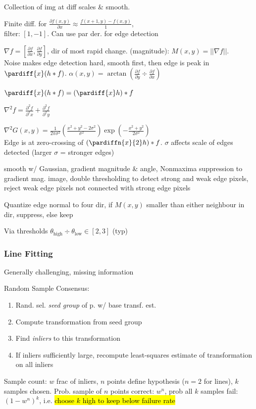  Collection of img at diff scales \& smooth.

\shortremark Finite diff. for $\frac{\partial f(x, y)}{\partial x} \approx \frac{f(x + 1, y) - f(x, y)}{1}$,\\
filter: $[1, -1]$. Can use par der. for edge detection

\shortdefinition[Gradient] $\nabla f = [\frac{\partial f}{\partial x}, \frac{\partial f}{\partial y}]$, dir of most rapid change.
 (magnitude): $M(x, y) = ||\nabla f||$.\\
Noise makes edge detection hard, smooth first, then edge is peak in $\pardiff{x}(h * f)$.
 $\alpha(x, y) = \arctan \left( \frac{\partial f}{\partial y} \div \frac{\partial f}{\partial x} \right)$

\shorttheorem $\pardiff{x}(h * f) = \left( \pardiff{x} h \right) * f$

\shortdefinition[Laplacian] $\nabla^2 f = \frac{\partial^2 f}{\partial^2 x} + \frac{\partial^2 f}{\partial^2 y}$

\shortdefinition[LoG] $\nabla^2 G(x, y) = \frac{1}{2\pi \sigma^2} \left( \frac{x^2 + y^2 - 2\sigma^2}{\sigma^2} \right)\exp\left( -\frac{x^2 + y^2}{2 \sigma^2} \right)$\\
Edge is at zero-crossing of $\left( \pardiffn{x}{2} h \right) * f$. $\sigma$ affects scale of edges detected (larger $\sigma$ = stronger edges)

\shortdefinition[Canny E.D.]  smooth w/ Gaussian,  gradient magnitude \& angle,  Nonmaxima suppression to gradient mag. image,
 double thresholding to detect strong and weak edge pixels,  reject weak edge pixels not connected with strong edge pixels

 Quantize edge normal to four dir, if $M(x, y)$ smaller than either neighbour in dir, suppress, else keep

\shortdefinition[Thresholding] Via thresholds $\theta_\text{high} \div \theta_\text{low} \in [2, 3]$ (typ)

\subsubsection{Line Fitting}
Generally challenging, missing information

\shortdefinition[RANSAC] Random Sample Consensus:
\begin{enumerate}
    \item Rand. sel. \textit{seed group} of p. w/ base transf. est.
    \item Compute transformation from seed group
    \item Find \textit{inliers} to this transformation
    \item If inliers sufficiently large, recompute least-squares estimate of transformation on all inliers
\end{enumerate}
Sample count: $w$ frac of inliers, $n$ points define hypothesis ($n = 2$ for lines), $k$ samples chosen.
Prob. sample of $n$ points correct: $w^n$, prob all $k$ samples fail: $(1 - w^n)^k$, i.e. \hl{choose $k$ high to keep below failure rate}




